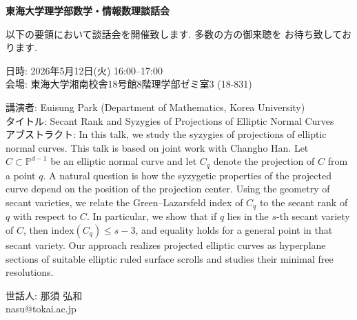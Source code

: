 \documentclass[10pt]{jarticle}
\title{}
\author{}
\date{}
\theoremstyle{definition}
\begin{document}

\begin{center}
 {\bf \Huge 東海大学理学部数学・情報数理談話会}
\end{center}

\bigskip

{\Large
以下の要領において談話会を開催致します. 多数の方の御来聴を
お待ち致しております. 

\bigskip

\noindent
日時: 2026年5月12日(火) 16:00--17:00\\
\smallskip
会場: 東海大学湘南校舎18号館8階理学部ゼミ室3 (18-831)\\

\medskip

\noindent
講演者: 
Euisung Park (Department of Mathematics, Korea University)\\
\smallskip
タイトル: 
Secant Rank and Syzygies of Projections of Elliptic Normal Curves\\

\noindent
アブストラクト:
In this talk, we study the syzygies of projections of elliptic normal curves. This talk is based on joint work with Changho Han. Let
$C \subset \mathbb{P}^{d-1}$ be an elliptic normal curve and let $C_q$ denote the projection of $C$ from a point $q$. A natural question is how the syzygetic properties of the projected curve depend on the position of the projection center.
Using the geometry of secant varieties, we relate the Green--Lazarsfeld index of $C_q$ to the secant rank of $q$ with respect to $C$. In particular, we show that if $q$ lies in the $s$-th secant variety of $C$, then $\mathrm{index}(C_q) \leq s-3$, and equality holds for a general point in that secant variety.
Our approach realizes projected elliptic curves as hyperplane sections of suitable elliptic ruled surface scrolls and studies their minimal free resolutions.

\vskip 2cm

\begin{flushright}
  世話人: 那須 弘和\\
  nasu@tokai.ac.jp
\end{flushright}
}
\end{document}

